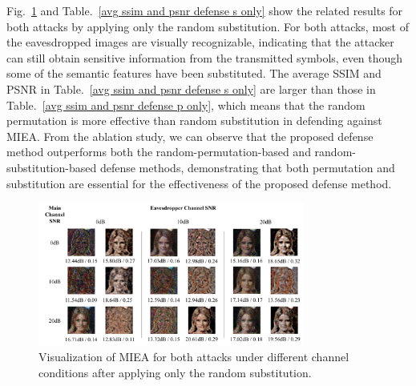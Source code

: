 \documentclass[conference]{IEEEtran}
\begin{document}
Fig.~\ref{defense eval s only} and Table.~\ref{avg ssim and psnr defense s only} show the related results for both attacks by applying only the random substitution. For both attacks, most of the eavesdropped images are visually recognizable, indicating that the attacker can still obtain sensitive information from the transmitted symbols, even though some of the semantic features have been substituted. The average SSIM and PSNR in Table.~\ref{avg ssim and psnr defense s only} are larger than those in Table.~\ref{avg ssim and psnr defense p only}, which means that the random permutation is more effective than random substitution in defending against MIEA. From the ablation study, we can observe that the proposed defense method outperforms both the random-permutation-based and random-substitution-based defense methods, demonstrating that both permutation and substitution are essential for the effectiveness of the proposed defense method.

\begin{figure}[htbp]
\centering
   \includegraphics[width=3.45in]{figures/defense_s.pdf}
\caption{Visualization of MIEA for both attacks under different channel conditions after applying only the random substitution.}
\label{defense eval s only}
\end{figure}
\end{document}
